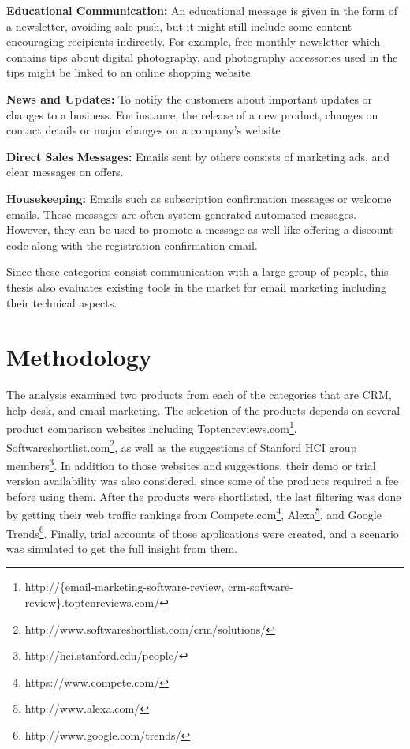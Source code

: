 \begin{compactitem}
	\item \textbf{Educational Communication:} An educational message is given in the form of a newsletter, avoiding sale push, but it might still include some content encouraging recipients indirectly. For example, free monthly newsletter which contains tips about digital photography, and photography accessories used in the tips might be linked to an online shopping website. 
	\item \textbf{News and Updates:} To notify the customers about important updates or changes to a business. For instance, the release of a new product, changes on contact details or major changes on a company's website
	\item \textbf{Direct Sales Messages:} Emails sent by others consists of marketing ads, and clear messages on offers.
	\item \textbf{Housekeeping:} Emails such as subscription confirmation messages or welcome emails. These messages are often system generated automated messages. However, they can be used to promote a message as well like offering a discount code along with the registration confirmation email.
\end{compactitem}

Since these categories consist communication with a large group of people, this thesis also evaluates existing tools in the market for email marketing including their technical aspects.

\section{Methodology}
\label{sec:3.2:Meth}

The analysis examined two products from each of the categories that are \ac{CRM}, help desk, and email marketing. The selection of the products depends on several product comparison websites including Toptenreviews.com\footnote{http://\{email-marketing-software-review, crm-software-review\}.toptenreviews.com/ }, Softwareshortlist.com\footnote{http://www.softwareshortlist.com/crm/solutions/}, as well as the suggestions of Stanford HCI group members\footnote{http://hci.stanford.edu/people/}. In addition to those websites and suggestions, their demo or trial version availability was also considered, since some of the products required a fee before using them. After the products were shortlisted, the last filtering was done by getting their web traffic rankings from Compete.com\footnote{https://www.compete.com/}, Alexa\footnote{http://www.alexa.com/}, and Google Trends\footnote{http://www.google.com/trends/}. Finally, trial accounts of those applications were created, and a scenario was simulated to get the full insight from them. 

